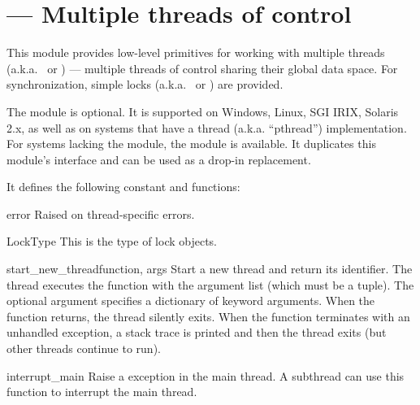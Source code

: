 \section{ ---
         Multiple threads of control}



This module provides low-level primitives for working with multiple
threads (a.k.a.\  or ) --- multiple
threads of control sharing their global data space.  For
synchronization, simple locks (a.k.a.\  or ) are provided.

The module is optional.  It is supported on Windows, Linux, SGI
IRIX, Solaris 2.x, as well as on systems that have a \POSIX{} thread
(a.k.a. ``pthread'') implementation.  For systems lacking the 
module, the  module is available.
It duplicates this module's interface and can be
used as a drop-in replacement.

It defines the following constant and functions:

\begin{excdesc}{error}
Raised on thread-specific errors.
\end{excdesc}

\begin{datadesc}{LockType}
This is the type of lock objects.
\end{datadesc}

\begin{funcdesc}{start_new_thread}{function, args}
Start a new thread and return its identifier.  The thread executes the function
 with the argument list  (which must be a tuple).  The
optional  argument specifies a dictionary of keyword arguments.
When the function returns, the thread silently exits.  When the function
terminates with an unhandled exception, a stack trace is printed and
then the thread exits (but other threads continue to run).
\end{funcdesc}

\begin{funcdesc}{interrupt_main}{}
Raise a  exception in the main thread.  A subthread
can use this function to interrupt the main thread.
\end{funcdesc}

